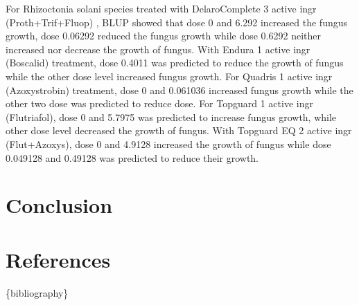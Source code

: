 \documentclass[
  10pt,
  letterpaper,
  twocolumn]{article}
\begin{document}
For Rhizoctonia solani species treated with DelaroComplete 3 active ingr
(Proth+Trif+Fluop) , BLUP showed that dose 0 and 6.292 increased the
fungus growth, dose 0.06292 reduced the fungus growth while dose 0.6292
neither increased nor decrease the growth of fungus. With Endura 1
active ingr (Boscalid) treatment, dose 0.4011 was predicted to reduce
the growth of fungus while the other dose level increased fungus growth.
For Quadris 1 active ingr (Azoxystrobin) treatment, dose 0 and 0.061036
increased fungus growth while the other two dose was predicted to reduce
dose. For Topguard 1 active ingr (Flutriafol), dose 0 and 5.7975 was
predicted to increase fungus growth, while other dose level decreased
the growth of fungus. With Topguard EQ 2 active ingr (Flut+Azoxys), dose
0 and 4.9128 increased the growth of fungus while dose 0.049128 and
0.49128 was predicted to reduce their growth.

\hypertarget{conclusion}{%
\section{Conclusion}\label{conclusion}}

\hypertarget{references}{%
\section{References}\label{references}}

\{bibliography\}
\end{document}

